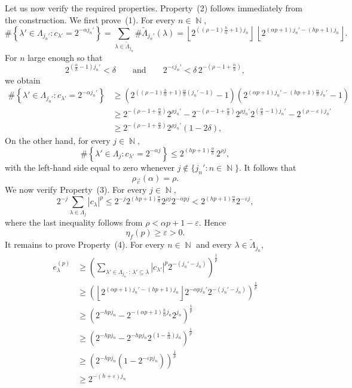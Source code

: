 \documentclass[a4paper,11pt,oneside]{article}
\DeclareMathOperator{\N}{\mathbb{N}}
\newcommand{\modu}[1]{\left\vert{#1}\right\vert}
\theoremstyle{definition}
\theoremstyle{plain}
\begin{document}
Let us now verify the required properties. Property~(2) follows immediately
from the construction. We first prove~(1). For every $n\in\N$,
\[
\#\left\{\lambda'\in\Lambda_{j_n'}:c_{\lambda'}=2^{-\alpha j_n'}\right\}=\sum_{\lambda\in\widetilde{\Lambda}_{j_n}}\#\widetilde{\Lambda}_{j_n'}(\lambda)=\left\lfloor 2^{\left((\rho-1)\frac{h}{\alpha}+1\right)j_n} \right\rfloor \, \left\lfloor 2^{(\alpha p+1)j_n'-(hp+1)j_n} \right\rfloor .
\]
For $n$ large enough so that
\[
2^{\left(\frac{\alpha}{h}-1\right)j_n'}<\delta
\qquad\text{and}\qquad
2^{-\varepsilon j_n'}
<
\delta\,2^{-\left(\rho-1+\frac{\alpha}{h}\right)},
\]
we obtain
\begin{align*}
    \#\left\{\lambda'\in\Lambda_{j_n'}:c_{\lambda'}=2^{-\alpha j_n'}\right\}
    & \geq \left(2^{\left((\rho-1)\frac{h}{\alpha}+1\right)\frac{\alpha}{h}(j_n'-1)}-1\right)\left(2^{(\alpha p+1)j_n'-(hp+1)\frac{\alpha}{h}\,j_n'}-1\right) \\
    & \geq 2^{-\left(\rho-1+\frac{\alpha}{h}\right)}2^{\rho j_n'}-2^{-\left(\rho-1+\frac{\alpha}{h}\right)}2^{\rho j_n'}2^{\left(\frac{\alpha}{h}-1\right)j_n'}-2^{(\rho-\varepsilon)j_n'} \\
    & \geq 2^{-\left(\rho-1+\frac{\alpha}{h}\right)}2^{\rho j_n'}\left(1-2\delta\right),
\end{align*}
On the other hand, for every $j\in\N$,
\[
\#\left\{\lambda'\in\Lambda_j:
c_{\lambda'}=2^{-\alpha j}\right\}
\leq
2^{(hp+1)\frac{\alpha}{h}}\,2^{\rho j},
\]
with the left-hand side equal to zero whenever
$j\notin\{j_n':n\in\N\}$.
It follows that
\[
\rho_{\vec c}(\alpha)=\rho.
\]
We now verify Property~(3). For every $j\in\N$,
\[
2^{-j}\sum_{\lambda\in\Lambda_j}|c_\lambda|^p
\leq
2^{-j}
2^{(hp+1)\frac{\alpha}{h}}
2^{\rho j}
2^{-\alpha pj}
<
2^{(hp+1)\frac{\alpha}{h}}2^{-\varepsilon j},
\]
where the last inequality follows from
$\rho<\alpha p+1-\varepsilon$. Hence
\[
\eta_f(p)\geq\varepsilon>0.
\]
It remains to prove Property~(4). For every $n\in\N$ and every
$\lambda\in\widetilde{\Lambda}_{j_n}$,
\begin{align*}
    e_\lambda^{(p)}
    & \geq \left(\sum_{\lambda'\in\Lambda_{j_n'}\,:\,\lambda'\subseteq\lambda}\modu{c_{\lambda'}}^p2^{-(j_n'-j_n)}\right)^{\frac{1}{p}} \\
    & \geq \left(\left\lfloor 2^{(\alpha p+1)j_n'-(hp+1)j_n} \right\rfloor 2^{-\alpha pj_n'}2^{-(j_n'-j_n)}\right)^{\frac{1}{p}} \\
    & \geq \left(2^{-hpj_n}-2^{-(\alpha p+1)\frac{h}{\alpha}j_n}2^{j_n}\right)^{\frac{1}{p}} \\
    & \geq \left(2^{-hpj_n}-2^{-hpj_n}2^{\left(1-\frac{h}{\alpha}\right)j_n}\right)^{\frac{1}{p}} \\
    & \geq \left(2^{-hpj_n}\left(1-2^{-\varepsilon p j_n}\right)\right)^{\frac{1}{p}} \\
    & \geq 2^{-(h+\varepsilon)j_n}
\end{align*}
\end{document}

